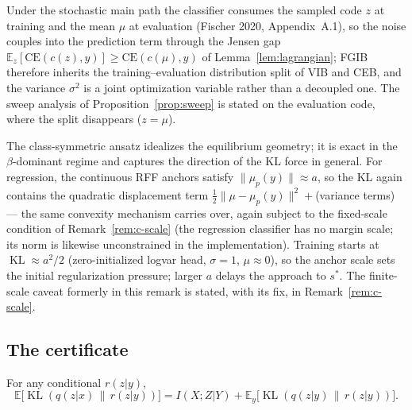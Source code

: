 \begin{remark}
Under the stochastic main path the classifier consumes the sampled code $z$ at training
and the mean $\mu$ at evaluation (Fischer 2020, Appendix~A.1), so the noise couples into
the prediction term through the Jensen gap
$\mathbb{E}_z[\mathrm{CE}(c(z),y)] \ge \mathrm{CE}(c(\mu),y)$ of
Lemma~\ref{lem:lagrangian}; FGIB therefore inherits the training--evaluation
distribution split of VIB and CEB, and the variance $\sigma^2$ is a joint optimization
variable rather than a decoupled one. The sweep analysis of
Proposition~\ref{prop:sweep} is stated on the evaluation code, where the split
disappears ($z = \mu$).
\end{remark}

\begin{remark}[Idealizations]\label{rem:caveats}
The class-symmetric ansatz idealizes the equilibrium geometry; it is exact in the
$\beta$-dominant regime and captures the direction of the KL force in general. For
regression, the continuous RFF anchors satisfy $\|\mu_p(y)\| \approx a$, so the KL again
contains the quadratic displacement term
$\tfrac{1}{2}\|\mu - \mu_p(y)\|^2 + {}$(variance terms) --- the same convexity mechanism
carries over, again subject to the fixed-scale condition of Remark~\ref{rem:c-scale}
(the regression classifier has no margin scale; its norm is likewise unconstrained in
the implementation). Training starts at $\operatorname{KL} \approx a^2/2$
(zero-initialized logvar head, $\sigma = 1$, $\mu \approx 0$), so the anchor scale sets
the initial regularization pressure; larger $a$ delays the approach to $s^*$. The
finite-scale caveat formerly in this remark is stated, with its fix, in
Remark~\ref{rem:c-scale}.
\end{remark}

\subsection{The certificate}

\begin{lemma}\label{lem:gap}
For any conditional $r(z|y)$,
\begin{equation}
\mathbb{E}\big[\operatorname{KL}(q(z|x)\,\|\,r(z|y))\big]
= I(X;Z|Y) + \mathbb{E}_y\big[\operatorname{KL}(q(z|y)\,\|\,r(z|y))\big] .
\label{eq:gap}
\end{equation}
\end{lemma}

